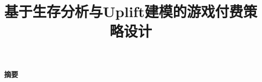 \documentclass[12pt,a4paper]{ctexart}
\title{\vspace{-0.8cm}\textbf{基于生存分析与Uplift建模的游戏付费策略设计}}
\author{}
\date{}
\begin{document}
\maketitle
\thispagestyle{empty}

\begin{center}
\large\textbf{摘要}
\end{center}



\clearpage
\setcounter{page}{1}
\pagestyle{fancy}
\tableofcontents
\clearpage











\end{document}
